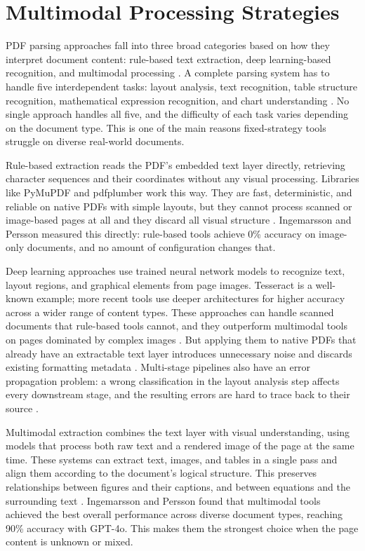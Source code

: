 \section{Multimodal Processing Strategies}

PDF parsing approaches fall into three broad categories based on how they
interpret document content: rule-based text extraction, deep learning-based
recognition, and multimodal processing \autocite{ingemarsson2024}. A complete
parsing system has to handle five interdependent tasks: layout analysis, text
recognition, table structure recognition, mathematical expression recognition,
and chart understanding \autocite{subramani2020}. No single approach handles all
five, and the difficulty of each task varies depending on the document type.
This is one of the main reasons fixed-strategy tools struggle on diverse
real-world documents.

Rule-based extraction reads the PDF's embedded text layer directly, retrieving
character sequences and their coordinates without any visual processing.
Libraries like PyMuPDF and pdfplumber work this way. They are fast,
deterministic, and reliable on native PDFs with simple layouts, but they cannot
process scanned or image-based pages at all and they discard all visual
structure \autocite{meuschke2023}. Ingemarsson and Persson
\autocite{ingemarsson2024} measured this directly: rule-based tools achieve 0\%
accuracy on image-only documents, and no amount of configuration changes that.

Deep learning approaches use trained neural network models to recognize text,
layout regions, and graphical elements from page images. Tesseract is a
well-known example; more recent tools use deeper architectures for higher
accuracy across a wider range of content types. These approaches can handle
scanned documents that rule-based tools cannot, and they outperform multimodal
tools on pages dominated by complex images \autocite{ingemarsson2024}. But
applying them to native PDFs that already have an extractable text layer
introduces unnecessary noise and discards existing formatting metadata
\autocite{meuschke2023}. Multi-stage pipelines also have an error propagation
problem: a wrong classification in the layout analysis step affects every
downstream stage, and the resulting errors are hard to trace back to their
source \autocite{duan2025}.

Multimodal extraction combines the text layer with visual understanding, using
models that process both raw text and a rendered image of the page at the same
time. These systems can extract text, images, and tables in a single pass and
align them according to the document's logical structure. This preserves
relationships between figures and their captions, and between equations and
the surrounding text \autocite{ingemarsson2024}. Ingemarsson and Persson
\autocite{ingemarsson2024} found that multimodal tools achieved the best overall
performance across diverse document types, reaching 90\% accuracy with GPT-4o.
This makes them the strongest choice when the page content is unknown or mixed.

